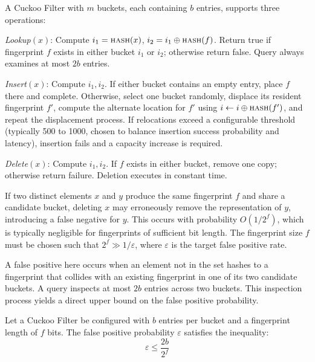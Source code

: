 \begin{definition}
    A Cuckoo Filter with $m$ buckets, each containing $b$ entries, supports three operations:

    \emph{Lookup}$(x)$: Compute $i_1 = \textsc{hash}(x)$, $i_2 = i_1 \oplus \textsc{hash}(f)$. Return true if fingerprint $f$ exists in either bucket $i_1$ or $i_2$; otherwise return false. Query always examines at most $2b$ entries.

    \emph{Insert}$(x)$: Compute $i_1, i_2$. If either bucket contains an empty entry, place $f$ there and complete. Otherwise, select one bucket randomly, displace its resident fingerprint $f'$, compute the alternate location for $f'$ using $i \gets i \oplus \textsc{hash}(f')$, and repeat the displacement process. If relocations exceed a configurable threshold (typically 500 to 1000, chosen to balance insertion success probability and latency), insertion fails and a capacity increase is required.

    \emph{Delete}$(x)$: Compute $i_1, i_2$. If $f$ exists in either bucket, remove one copy; otherwise return failure. Deletion executes in constant time.

    \begin{remark}
        If two distinct elements $x$ and $y$ produce the same fingerprint $f$ and share a candidate bucket, deleting $x$ may erroneously remove the representation of $y$, introducing a false negative for $y$. This occurs with probability $O(1/2^f)$, which is typically negligible for fingerprints of sufficient bit length. The fingerprint size $f$ must be chosen such that $2^f \gg 1/\varepsilon$, where $\varepsilon$ is the target false positive rate.
    \end{remark}
\end{definition}

A false positive here occurs when an element not in the set hashes to a fingerprint that collides with an existing fingerprint in one of its two candidate buckets. A query inspects at most $2b$ entries across two buckets. This inspection process yields a direct upper bound on the false positive probability.

\begin{proposition}
    Let a Cuckoo Filter be configured with $b$ entries per bucket and a fingerprint length of $f$ bits. The false positive probability $\varepsilon$ satisfies the inequality:
    \begin{equation*}
        \varepsilon \leq \frac{2b}{2^f}
    \end{equation*}
\end{proposition}

